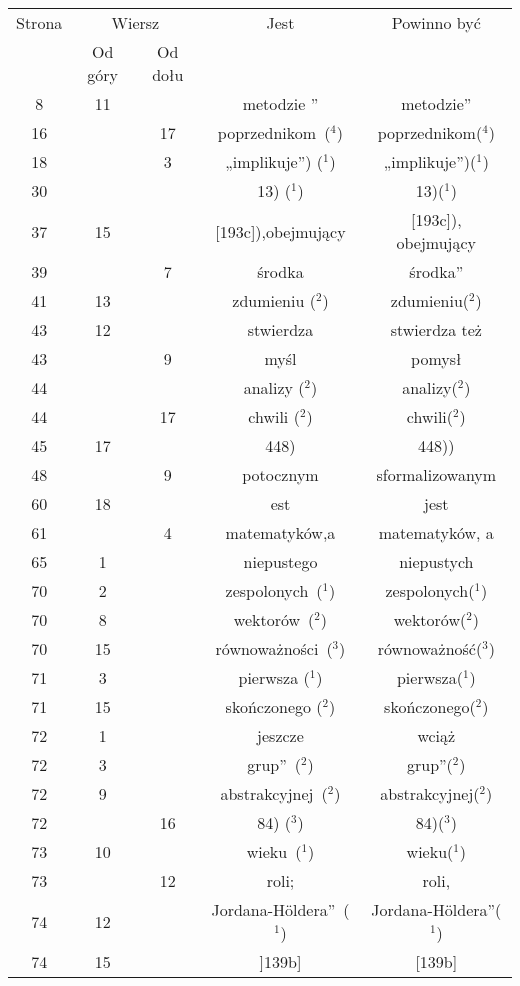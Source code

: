 \documentclass[a4paper,11pt]{article}
\numberwithin{equation}{section}
\begin{document}
\begin{center}

  \begin{tabular}{|c|c|c|c|c|}
    \hline
    Strona & \multicolumn{2}{c|}{Wiersz} & Jest
                              & Powinno być \\ \cline{2-3}
    & Od góry & Od dołu & & \\
    \hline
    8   & 11 & & metodzie ” & metodzie” \\
    16  & & 17 & poprzednikom~($^{ 4 }$) & poprzednikom($^{ 4 }$) \\
    18  & &  3 & „implikuje”) ($^{ 1 }$) & „implikuje”)($^{ 1 }$) \\
    30  & & & 13) ($^{ 1 }$) & 13)($^{ 1 }$) \\
    37  & 15 & & [193c]),obejmujący & [193c]), obejmujący \\
    39  & &  7 & środka & środka” \\
    41  & 13 & & zdumieniu ($^{ 2 }$) & zdumieniu($^{ 2 }$) \\
    43  & 12 & & stwierdza & stwierdza też \\
    43  & &  9 & myśl & pomysł \\
    44  & & & analizy ($^{ 2 }$) & analizy($^{ 2 }$) \\
    44  & & 17 & chwili ($^{ 2 }$) & chwili($^{ 2 }$) \\
    45  & 17 & & 448) & 448)) \\
    48  & &  9 & potocznym & sformalizowanym \\
    60  & 18 & & est & jest \\
    61  & &  4 & matematyków,a & matematyków, a \\
    65  &  1 & & niepustego & niepustych \\
    70  &  2 & & zespolonych~($^{ 1 }$) & zespolonych($^{ 1 }$) \\
    70  &  8 & & wektorów~($^{ 2 }$) & wektorów($^{ 2 }$) \\
    70  & 15 & & równoważności~($^{ 3 }$) & równoważność($^{ 3 }$) \\
    71  &  3 & & pierwsza ($^{ 1 }$) & pierwsza($^{ 1 }$) \\
    71  & 15 & & skończonego ($^{ 2 }$) & skończonego($^{ 2 }$) \\
    72  &  1 & & jeszcze & wciąż \\
    72  &  3 & & grup”~($^{ 2 }$) & grup”($^{ 2 }$) \\
    72  &  9 & & abstrakcyjnej~($^{ 2 }$) & abstrakcyjnej($^{ 2 }$) \\
    72  & & 16 & 84) ($^{ 3 }$) & 84)($^{ 3 }$) \\
    73  & 10 & & wieku~($^{ 1 }$) & wieku($^{ 1 }$) \\
    73  & & 12 & roli; & roli, \\
    74  & 12 & & Jordana-H\"{o}ldera”~($^{ 1 }$)
    & Jordana-H\"{o}ldera”($^{ 1 }$) \\
    74  & 15 & & ]139b] & [139b] \\
    \hline
  \end{tabular}






\end{center}
\end{document}
